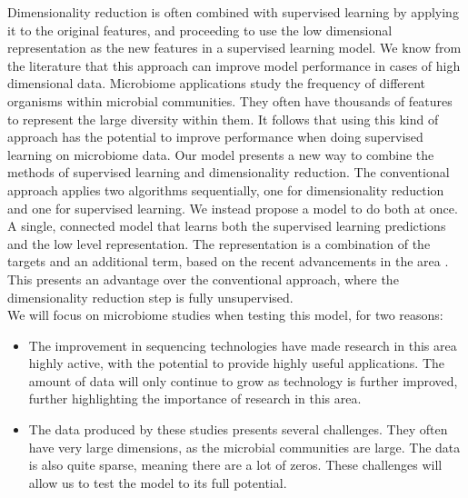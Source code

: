 Dimensionality reduction is often combined with supervised learning by applying it to the original features, and proceeding to use the low dimensional representation as the new features in a supervised learning model. We know from the literature that this approach can improve model performance in cases of high dimensional data. Microbiome applications study the frequency of different organisms within microbial communities. They often have thousands of features to represent the large diversity within them. It follows that using this kind of approach has the potential to improve performance when doing supervised learning on microbiome data. Our model presents a new way to combine the methods of supervised learning and dimensionality reduction. The conventional approach applies two algorithms sequentially, one for dimensionality reduction and one for supervised learning. We instead propose a model to do both at once. A single, connected model that learns both the supervised learning predictions and the low level representation. The representation is a combination of the targets and an additional term, based on the recent advancements in the area \citep{Avalos2018}. This presents an advantage over the conventional approach, where the dimensionality reduction step is fully unsupervised. \\

We will focus on microbiome studies when testing this model, for two reasons:
\begin{itemize}
    \item The improvement in sequencing technologies have made research in this area highly active, with the potential to provide highly useful applications. The amount of data will only continue to grow as technology is further improved, further highlighting the importance of research in this area.
    \item The data produced by these studies presents several challenges. They often have very large dimensions, as the microbial communities are large. The data is also quite sparse, meaning there are a lot of zeros. These challenges will allow us to test the model to its full potential. 
\end{itemize} 

